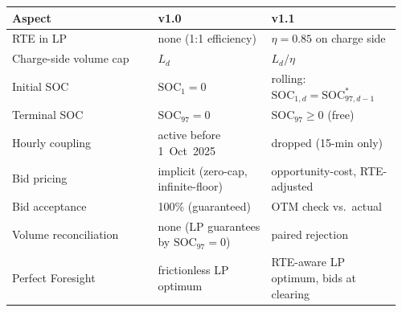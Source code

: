 \documentclass{article}
\numberwithin{equation}{subsection}
\begin{document}
\begin{tabular}{@{}p{0.36\linewidth}p{0.28\linewidth}p{0.32\linewidth}@{}}
\toprule
Aspect & v1.0 & v1.1 \\
\midrule
RTE in LP & none (1:1 efficiency) & \(\eta=0.85\) on charge side \\
Charge-side volume cap & \(L_d\) & \(L_d / \eta\) \\
Initial SOC & \(\mathrm{SOC}_1 = 0\) & rolling: \(\mathrm{SOC}_{1,d} = \mathrm{SOC}^{*}_{97,d-1}\) \\
Terminal SOC & \(\mathrm{SOC}_{97} = 0\) & \(\mathrm{SOC}_{97} \geq 0\) (free) \\
Hourly coupling & active before 1~Oct~2025 & dropped (15-min only) \\
Bid pricing & implicit (zero-cap, infinite-floor) & opportunity-cost, RTE-adjusted \\
Bid acceptance & 100\% (guaranteed) & OTM check vs.\ actual \\
Volume reconciliation & none (LP guarantees by \(\mathrm{SOC}_{97}=0\)) & paired rejection \\
Perfect Foresight & frictionless LP optimum & RTE-aware LP optimum, bids at clearing \\
\bottomrule
\end{tabular}
\end{document}
